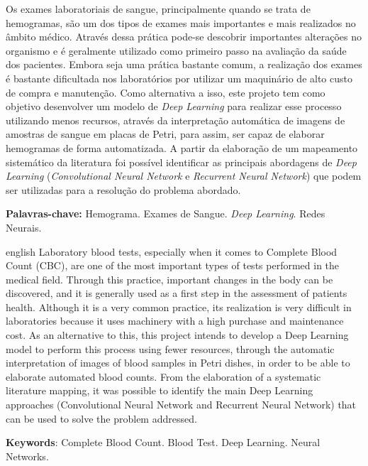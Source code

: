 \documentclass[
	10pt,			 	  %
	oneside,
	a4paper,			  %
	chapter=TITLE,		  %
	english,			 %
	brazil				 %
	]{abntex2}
\begin{document}
\setlength{\absparsep}{18pt} %
\begin{resumo}
	Os exames laboratoriais de sangue, principalmente quando se trata de hemogramas, são um dos tipos de exames mais importantes e mais realizados no âmbito médico. Através dessa prática pode-se descobrir importantes alterações no organismo e é geralmente utilizado como primeiro passo na avaliação da saúde dos pacientes. Embora seja uma prática bastante comum, a realização dos exames é bastante dificultada nos laboratórios por utilizar um maquinário de alto custo de compra e manutenção. Como alternativa a isso, este projeto tem como objetivo desenvolver um modelo de \emph{Deep Learning} para realizar esse processo utilizando menos recursos, através da interpretação automática de imagens de amostras de sangue em placas de Petri, para assim, ser capaz de elaborar hemogramas de forma automatizada. A partir da elaboração de um mapeamento sistemático da literatura foi possível identificar as principais abordagens de \emph{Deep Learning} (\emph{Convolutional Neural Network} e \emph{Recurrent Neural Network}) que podem ser utilizadas para a resolução do problema abordado.
	
	\textbf{Palavras-chave:} Hemograma. Exames de Sangue. \emph{Deep Learning}. Redes Neurais.
\end{resumo}

\begin{resumo}[Abstract]
	\begin{otherlanguage*}{english}
		Laboratory blood tests, especially when it comes to Complete Blood Count (CBC), are one of the most important types of tests performed in the medical field. Through this practice, important changes in the body can be discovered, and it is generally used as a first step in the assessment of patients health. Although it is a very common practice, its realization is very difficult in laboratories because it uses machinery with a high purchase and maintenance cost. As an alternative to this, this project intends to develop a Deep Learning model to perform this process using fewer resources, through the automatic interpretation of images of blood samples in Petri dishes, in order to be able to elaborate automated blood counts. From the elaboration of a systematic literature mapping, it was possible to identify the main Deep Learning approaches (Convolutional Neural Network and Recurrent Neural Network) that can be used to solve the problem addressed.
		\vspace{\onelineskip}
		\noindent 
		
		\textbf{Keywords}: Complete Blood Count. Blood Test. Deep Learning. Neural Networks.
	\end{otherlanguage*}
\end{resumo}
\end{document}
